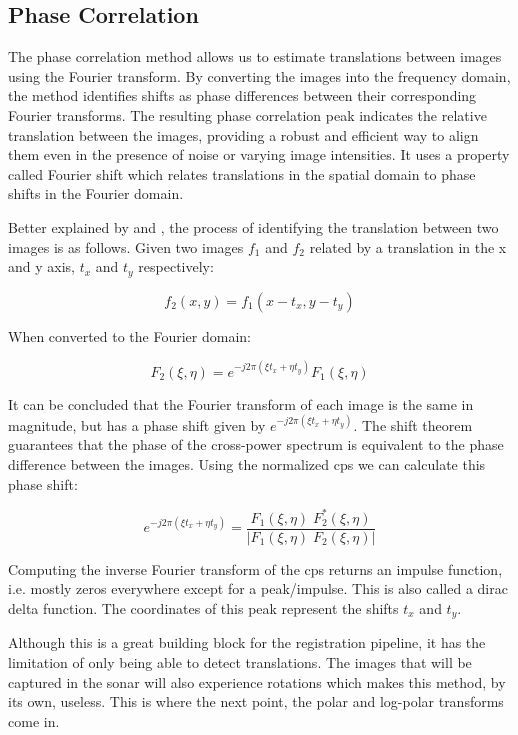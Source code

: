 \subsection{Phase Correlation}

The phase correlation method allows us to estimate translations between images using the Fourier transform. By converting the images into the frequency domain, the method identifies shifts as phase differences between their corresponding Fourier transforms. The resulting phase correlation peak indicates the relative translation between the images, providing a robust and efficient way to align them even in the presence of noise or varying image intensities. It uses a property called Fourier shift which relates translations in the spatial domain to phase shifts in the Fourier domain. 


Better explained by \citeauthor{Reddy1996}\cite{Reddy1996} and \citeauthor{5396234}\cite{5396234}, the process of identifying the translation between two images is as follows. Given two images \(f_1\) and \(f_2\) related by a translation in the x and y axis, \(t_x\) and \(t_y\) respectively:

\[f_2(x,y)=f_1(x-t_x,y-t_y)\]

When converted to the Fourier domain:

\[F_2(\xi,\eta)=e^{-j2\pi(\xi t_x + \eta t_y)} F_1(\xi,\eta)\]

It can be concluded that the Fourier transform of each image is the same in magnitude, but has a phase shift given by \(e^{-j2\pi(\xi t_x + \eta t_y)}\). The shift theorem guarantees that the phase of the cross-power spectrum is equivalent to the phase difference between the images. Using the normalized \acrfull{cps} we can calculate this phase shift:

\[e^{-j2\pi(\xi t_x + \eta t_y)} = \frac{F_1(\xi,\eta) \; F_2^*(\xi,\eta)}{|F_1(\xi,\eta) \; F_2(\xi,\eta)|}\]

Computing the inverse Fourier transform of the \acrshort{cps} returns an impulse function, i.e. mostly zeros everywhere except for a peak/impulse. This is also called a dirac delta function. The coordinates of this peak represent the shifts \(t_x\) and \(t_y\).

Although this is a great building block for the registration pipeline, it has the limitation of only being able to detect translations. The images that will be captured in the sonar will also experience rotations which makes this method, by its own, useless. This is where the next point, the polar and log-polar transforms come in.

